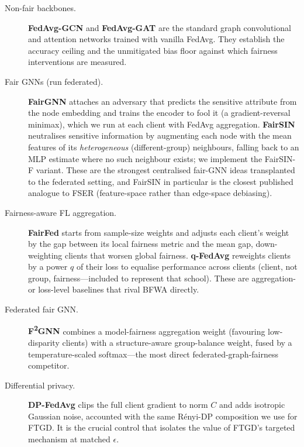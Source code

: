 \documentclass[pdflatex,sn-mathphys-num]{sn-jnl}
\theoremstyle{thmstyleone}%
\theoremstyle{thmstyletwo}%
\theoremstyle{thmstylethree}%
\begin{document}
\begin{description}
\item[Non-fair backbones.] \textbf{FedAvg-GCN} and \textbf{FedAvg-GAT}
\cite{kipf2016semi,velickovic2017graph,mcmahan2017communication} are the
standard graph convolutional and attention networks trained with vanilla FedAvg.
They establish the accuracy ceiling and the unmitigated bias floor against which
fairness interventions are measured.

\item[Fair GNNs (run federated).] \textbf{FairGNN} \cite{dai2021say} attaches an
adversary that predicts the sensitive attribute from the node embedding and
trains the encoder to fool it (a gradient-reversal minimax), which we run at each
client with FedAvg aggregation. \textbf{FairSIN} \cite{yang2024fairsin}
neutralises sensitive information by augmenting each node with the mean features
of its \emph{heterogeneous} (different-group) neighbours, falling back to an MLP
estimate where no such neighbour exists; we implement the FairSIN-F variant.
These are the strongest centralised fair-GNN ideas transplanted to the federated
setting, and FairSIN in particular is the closest published analogue to FSER
(feature-space rather than edge-space debiasing).

\item[Fairness-aware FL aggregation.] \textbf{FairFed} \cite{ezzeldin2023fairfed}
starts from sample-size weights and adjusts each client's weight by the gap
between its local fairness metric and the mean gap, down-weighting clients that
worsen global fairness. \textbf{q-FedAvg} \cite{li2020fair} reweights clients by
a power $q$ of their loss to equalise performance across clients (client, not
group, fairness---included to represent that school). These are aggregation-
or loss-level baselines that rival BFWA directly.

\item[Federated fair GNN.] \textbf{F\textsuperscript{2}GNN} \cite{f2gnn2023}
combines a model-fairness aggregation weight (favouring low-disparity clients)
with a structure-aware group-balance weight, fused by a temperature-scaled
softmax---the most direct federated-graph-fairness competitor.

\item[Differential privacy.] \textbf{DP-FedAvg} \cite{mcmahan2018learning} clips
the full client gradient to norm $C$ and adds isotropic Gaussian noise,
accounted with the same R\'enyi-DP composition we use for FTGD. It is the crucial
control that isolates the value of FTGD's targeted mechanism at matched
$\epsilon$.


\end{description}
\end{document}

